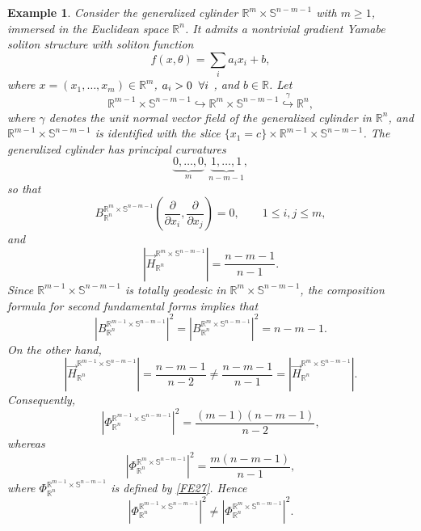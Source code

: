 \documentclass[11pt]{amsart}
\newtheorem{example}[theorem]{Example}
\numberwithin{equation}{section}
\begin{document}
\begin{example}\label{exam1}
Consider the generalized cylinder
$\mathbb{R}^{m}\times\mathbb{S}^{n-m-1}$ with $m\ge 1$, immersed in the Euclidean space $\mathbb{R}^{n}$. It admits a nontrivial gradient Yamabe soliton structure
with soliton function
\[
f(x,\theta)=\sum_i a_ix_i+b,
\]
where $x=(x_1,\ldots,x_m)\in\mathbb{R}^{m}$,
$a_i>0 \hspace{2mm}\forall i$ , and $b\in\mathbb{R}$.
Let
\[
\mathbb{R}^{m-1}\times\mathbb{S}^{n-m-1}
\hookrightarrow
\mathbb{R}^{m}\times\mathbb{S}^{n-m-1}
\overset{\gamma}{\hookrightarrow}
\mathbb{R}^{n},
\]
where $\gamma$ denotes the unit normal vector field of the generalized
cylinder in $\mathbb{R}^{n}$, and
$\mathbb{R}^{m-1}\times\mathbb{S}^{n-m-1}$ is identified with the slice
$\{x_1=c\}\times\mathbb{R}^{m-1}\times\mathbb{S}^{n-m-1}$.
The generalized cylinder has principal curvatures
\[
\underbrace{0,\ldots,0}_{m},
\underbrace{1,\ldots,1}_{n-m-1},
\]
so that
\[
B^{\mathbb{R}^{m}\times\mathbb{S}^{n-m-1}}_{\mathbb{R}^{n}}
\left(\frac{\partial}{\partial x_i},
\frac{\partial}{\partial x_j}\right)=0,
\qquad
1\le i,j\le m,
\]
and
\[
\left|
\vec{H}^{\mathbb{R}^{m}\times\mathbb{S}^{n-m-1}}_{\mathbb{R}^{n}}
\right|
=
\frac{n-m-1}{n-1}.
\]
Since
$\mathbb{R}^{m-1}\times\mathbb{S}^{n-m-1}$
is totally geodesic in
$\mathbb{R}^{m}\times\mathbb{S}^{n-m-1}$,
the composition formula for second
fundamental forms implies that
\[
\left|
B^{\mathbb{R}^{m-1}\times\mathbb{S}^{n-m-1}}_{\mathbb{R}^{n}}
\right|^2
=
\left|
B^{\mathbb{R}^{m}\times\mathbb{S}^{n-m-1}}_{\mathbb{R}^{n}} \right|^2
=n-m-1.
\]
On the other hand,
\[
\left|
\vec{H}^{\mathbb{R}^{m-1}\times\mathbb{S}^{n-m-1}}_{\mathbb{R}^{n}}
\right|
=
\frac{n-m-1}{n-2}
\neq
\frac{n-m-1}{n-1}
=
\left|
\vec{H}^{\mathbb{R}^{m}\times\mathbb{S}^{n-m-1}}_{\mathbb{R}^{n}}
\right|.
\]
Consequently,
\[
\left|
\Phi^{\mathbb{R}^{m-1}\times\mathbb{S}^{n-m-1}}_{\mathbb{R}^{n}}
\right|^2
=
\frac{(m-1)(n-m-1)}{n-2},
\]
whereas
\[
\left|
\Phi^{\mathbb{R}^{m}\times\mathbb{S}^{n-m-1}}_{\mathbb{R}^{n}}
\right|^2
=
\frac{m(n-m-1)}{n-1},
\]
where $\Phi^{\mathbb{R}^{m-1}\times\mathbb{S}^{n-m-1}}_{\mathbb{R}^{n}}$ is defined by \eqref{FE27}.
Hence
\[
\left|
\Phi^{\mathbb{R}^{m-1}\times\mathbb{S}^{n-m-1}}_{\mathbb{R}^{n}}
\right|^2
\neq
\left|
\Phi^{\mathbb{R}^{m}\times\mathbb{S}^{n-m-1}}_{\mathbb{R}^{n}}
\right|^2.
\]
\end{example}
\end{document}
